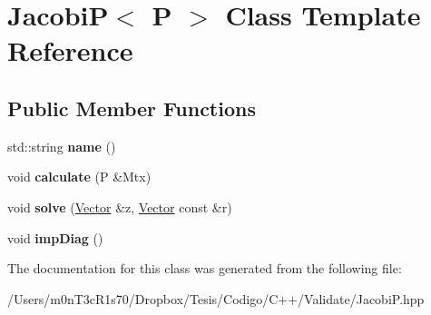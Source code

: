 \hypertarget{class_jacobi_p}{}\section{JacobiP$<$ P $>$ Class Template Reference}
\label{class_jacobi_p}
\subsection*{Public Member Functions}
\begin{DoxyCompactItemize}
\item 
\hypertarget{class_jacobi_p_a41babf774ebbc9eff0c8dc73391b362d}{}\label{class_jacobi_p_a41babf774ebbc9eff0c8dc73391b362d} 
std\+::string {\bfseries name} ()
\item 
\hypertarget{class_jacobi_p_a3e542b0258aa91f81c5b5c1d1a74a74f}{}\label{class_jacobi_p_a3e542b0258aa91f81c5b5c1d1a74a74f} 
void {\bfseries calculate} (P \&Mtx)
\item 
\hypertarget{class_jacobi_p_af5692cb3612c62496e46b34f7cf5dc61}{}\label{class_jacobi_p_af5692cb3612c62496e46b34f7cf5dc61} 
void {\bfseries solve} (\hyperlink{class_vector}{Vector} \&z, \hyperlink{class_vector}{Vector} const \&r)
\item 
\hypertarget{class_jacobi_p_ae8fb5355d76bee315354253c1402615d}{}\label{class_jacobi_p_ae8fb5355d76bee315354253c1402615d} 
void {\bfseries imp\+Diag} ()
\end{DoxyCompactItemize}


The documentation for this class was generated from the following file\+:\begin{DoxyCompactItemize}
\item 
/\+Users/m0n\+T3c\+R1s70/\+Dropbox/\+Tesis/\+Codigo/\+C++/\+Validate/Jacobi\+P.\+hpp\end{DoxyCompactItemize}

